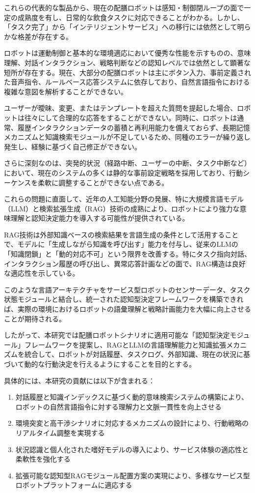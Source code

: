\documentclass[12pt]{report}
\begin{document}
これらの代表的な製品から、現在の配膳ロボットは感知・制御閉ループの面で一定の成熟度を有し、日常的な飲食タスクに対応できることがわかる。しかし、「タスク完了」から「インテリジェントサービス」への移行には依然として明らかな格差が存在する。

ロボットは運動制御と基本的な環境適応において優秀な性能を示すものの、意味理解、対話インタラクション、戦略判断などの認知レベルでは依然として顕著な短所が存在する。現在、大部分の配膳ロボットは主にボタン入力、事前定義された音声指令、ルールベース応答システムに依存しており、自然言語指令における複雑な意図を解析することができない。

ユーザーが曖昧、変更、またはテンプレートを超えた質問を提起した場合、ロボットは往々にして合理的な応答をすることができない。同時に、ロボットは通常、履歴インタラクションデータの蓄積と再利用能力を備えておらず、長期記憶メカニズムと知識検索モジュールが不足しているため、同種のエラーが繰り返し発生し、経験に基づく自己修正ができない。

さらに深刻なのは、突発的状況（経路中断、ユーザーの中断、タスク中断など）において、現在のシステムの多くは静的な事前設定戦略を採用しており、行動シーケンスを柔軟に調整することができない点である。

これらの問題に直面して、近年の人工知能分野の発展、特に大規模言語モデル（LLM）と検索拡張生成（RAG）技術の成熟により、ロボットにより強力な意味理解と認知決定能力を導入する可能性が提供されている。

RAG技術は外部知識ベースの検索結果を言語生成の条件として活用することで、モデルに「生成しながら知識を呼び出す」能力を付与し、従来のLLMの「知識閉鎖」と「動的対応不可」という限界を改善する。特にタスク指向対話、インタラクション履歴の呼び出し、異常応答計画などの面で、RAG構造は良好な適応性を示している。

このような言語アーキテクチャをサービス型ロボットのセンサーデータ、タスク状態モジュールと結合し、統一された認知型決定フレームワークを構築できれば、実際の環境におけるロボットの語彙理解と戦略計画能力を大幅に向上させることが期待される。

したがって、本研究では配膳ロボットシナリオに適用可能な「認知型決定モジュール」フレームワークを提案し、RAGとLLMの言語理解能力と知識拡張メカニズムを統合して、ロボットが対話履歴、タスクログ、外部知識、現在の状況に基づいて動的な行動決定を行えるようにすることを目的とする。

具体的には、本研究の貢献には以下が含まれる：
\begin{enumerate}
  \item 対話履歴と知識インデックスに基づく動的意味検索システムの構築により、ロボットの自然言語指令に対する理解力と文脈一貫性を向上させる
  \item 環境突変と高干渉シナリオに対応するメカニズムの設計により、行動戦略のリアルタイム調整を実現する
  \item 状況認識と個人化された嗜好モデルの導入により、サービス体験の適応性と柔軟性を強化する
  \item 拡張可能な認知型RAGモジュール配置方案の実現により、多様なサービス型ロボットプラットフォームに適応する
\end{enumerate}
\end{document}
